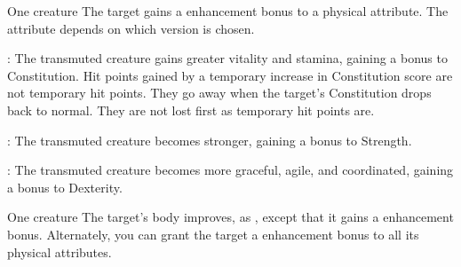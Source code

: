 \begin{spellheader}
    \spellrng{\rngtouch}
    \spelldur{\durshort}
\end{spellheader}
\begin{spelleffects}
    \begin{spelltarget}{One creature}
        \spelleffect The target gains a  enhancement bonus to a physical attribute. The attribute depends on which version is chosen.
        \par {}: The transmuted creature gains greater vitality and stamina, gaining a bonus to Constitution. Hit points gained by a temporary increase in Constitution score are not temporary hit points. They go away when the target's Constitution drops back to normal. They are not lost first as temporary hit points are.
        \par {}: The transmuted creature becomes stronger, gaining a bonus to Strength.
        \par {}: The transmuted creature becomes more graceful, agile, and coordinated, gaining a bonus to Dexterity.
    \end{spelltarget}
\end{spelleffects}
\begin{spellfooter}
    
\end{spellfooter}

\begin{spellheader}
    \spellrng{\rngtouch}
    \spelldur{\durshort}
\end{spellheader}
\begin{spelleffects}
    \begin{spelltarget}{One creature}
        \spelleffect The target's body improves, as , except that it gains a  enhancement bonus. Alternately, you can grant the target a  enhancement bonus to all its physical attributes.
    \end{spelltarget}
\end{spelleffects}
\begin{spellfooter}
    
\end{spellfooter}

